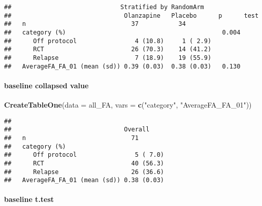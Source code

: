 \documentclass[]{article}
\newenvironment{Shaded}{\begin{snugshade}}{\end{snugshade}}
\newcommand{\KeywordTok}[1]{\textcolor[rgb]{0.13,0.29,0.53}{\textbf{#1}}}
\newcommand{\DataTypeTok}[1]{\textcolor[rgb]{0.13,0.29,0.53}{#1}}
\newcommand{\StringTok}[1]{\textcolor[rgb]{0.31,0.60,0.02}{#1}}
\newcommand{\NormalTok}[1]{#1}
\let\oldparagraph\paragraph
\renewcommand{\paragraph}[1]{\oldparagraph{#1}\mbox{}}
\theoremstyle{definition}
\theoremstyle{definition}
\theoremstyle{definition}
\theoremstyle{remark}
\begin{document}
\begin{verbatim}
##                              Stratified by RandomArm
##                               Olanzapine   Placebo      p      test
##   n                             37           34                    
##   category (%)                                           0.004     
##      Off protocol                4 (10.8)     1 ( 2.9)             
##      RCT                        26 (70.3)    14 (41.2)             
##      Relapse                     7 (18.9)    19 (55.9)             
##   AverageFA_FA_01 (mean (sd)) 0.39 (0.03)  0.38 (0.03)   0.130
\end{verbatim}

\paragraph{baseline collapsed value}\label{baseline-collapsed-value}

\begin{Shaded}
\begin{Highlighting}[]
\KeywordTok{CreateTableOne}\NormalTok{(}\DataTypeTok{data =}\NormalTok{ all_FA,}
               \DataTypeTok{vars =} \KeywordTok{c}\NormalTok{(}\StringTok{"category"}\NormalTok{, }\StringTok{"AverageFA_FA_01"}\NormalTok{))}
\end{Highlighting}
\end{Shaded}

\begin{verbatim}
##                              
##                               Overall     
##   n                             71        
##   category (%)                            
##      Off protocol                5 ( 7.0) 
##      RCT                        40 (56.3) 
##      Relapse                    26 (36.6) 
##   AverageFA_FA_01 (mean (sd)) 0.38 (0.03)
\end{verbatim}

\paragraph{baseline t.test}\label{baseline-t.test}
\end{document}
